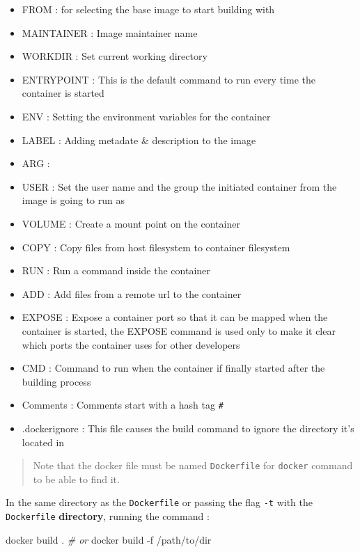 \documentclass[
  14pt,
  english,
  a4paper,
]{scrreprt}
\newenvironment{Shaded}{}{}
\newcommand{\CommentTok}[1]{\textcolor[rgb]{0.38,0.63,0.69}{\textit{#1}}}
\newcommand{\ExtensionTok}[1]{#1}
\newcommand{\NormalTok}[1]{#1}
\providecommand{\tightlist}{%
  \setlength{\itemsep}{0pt}\setlength{\parskip}{0pt}}
\begin{document}
\begin{itemize}
\tightlist
\item
  FROM : for selecting the base image to start building with
\item
  MAINTAINER : Image maintainer name
\item
  WORKDIR : Set current working directory
\item
  ENTRYPOINT : This is the default command to run every time the
  container is started
\item
  ENV : Setting the environment variables for the container
\item
  LABEL : Adding metadate \& description to the image
\item
  ARG :
\item
  USER : Set the user name and the group the initiated container from
  the image is going to run as
\item
  VOLUME : Create a mount point on the container
\item
  COPY : Copy files from host filesystem to container filesystem
\item
  RUN : Run a command inside the container
\item
  ADD : Add files from a remote url to the container
\item
  EXPOSE : Expose a container port so that it can be mapped when the
  container is started, the EXPOSE command is used only to make it clear
  which ports the container uses for other developers
\item
  CMD : Command to run when the container if finally started after the
  building process
\item
  Comments : Comments start with a hash tag \texttt{\#}
\item
  .dockerignore : This file causes the build command to ignore the
  directory it's located in
\end{itemize}

\begin{quote}
Note that the docker file must be named \texttt{Dockerfile} for
\texttt{docker} command to be able to find it.
\end{quote}

In the same directory as the \texttt{Dockerfile} or passing the flag
\texttt{-t} with the \texttt{Dockerfile} \textbf{directory}, running the
command :

\begin{Shaded}
\begin{Highlighting}[]
\ExtensionTok{docker}\NormalTok{ build .}
\CommentTok{\# or}
\ExtensionTok{docker}\NormalTok{ build {-}f /path/to/dir}
\end{Highlighting}
\end{Shaded}
\end{document}
